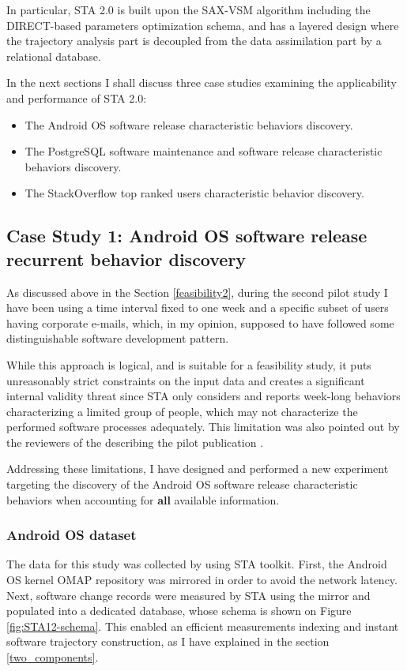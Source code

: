 In particular, STA 2.0 is built upon the SAX-VSM algorithm including the DIRECT-based parameters optimization schema, and has a layered design where the trajectory analysis part is decoupled from the data assimilation part by a relational database.

In the next sections I shall discuss three case studies examining the applicability and performance of STA 2.0:
\begin{itemize}
 \item The Android OS software release characteristic behaviors discovery.
 \item The PostgreSQL software maintenance and software release characteristic behaviors discovery.
 \item The StackOverflow top ranked users characteristic behavior discovery.
\end{itemize}

\subsection{Case Study 1: Android OS software release recurrent behavior discovery}\label{case1}
As discussed above in the Section \ref{feasibility2}, during the second pilot study I have been using a time interval fixed to one week and a specific subset of users having corporate e-mails, which, in my opinion, supposed to have followed some distinguishable software development pattern. 

While this approach is logical, and is suitable for a feasibility study, it puts unreasonably strict constraints on the input data and creates a significant internal validity threat since STA only considers and reports week-long behaviors characterizing a limited group of people, which may not characterize the performed software processes adequately. This limitation was also pointed out by the reviewers of the describing the pilot publication \cite{csdl2-11-10}.

Addressing these limitations, I have designed and performed a new experiment targeting the discovery of the Android OS software release characteristic behaviors when accounting for \textbf{all} available information.

\subsubsection{Android OS dataset}
The data for this study was collected by using STA toolkit. First, the Android OS kernel OMAP repository was mirrored in order to avoid the network latency. Next, software change records were measured by STA using the mirror and populated into a dedicated database, whose schema is shown on Figure \ref{fig:STA12-schema}. This enabled an efficient measurements indexing and instant software trajectory construction, as I have explained in the section \ref{two_components}.

